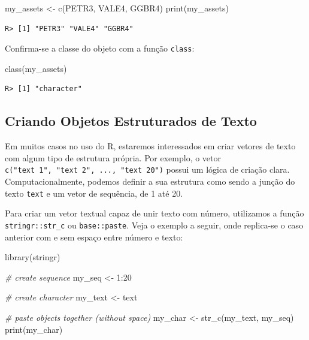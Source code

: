 \documentclass[
  11pt,
]{book}
\newenvironment{Shaded}{\begin{snugshade}}{\end{snugshade}}
\newcommand{\CommentTok}[1]{\textcolor[rgb]{0.37,0.37,0.37}{\textit{#1}}}
\newcommand{\DecValTok}[1]{\textcolor[rgb]{0.06,0.06,0.06}{#1}}
\newcommand{\FunctionTok}[1]{\textcolor[rgb]{0,0,0}{#1}}
\newcommand{\NormalTok}[1]{#1}
\newcommand{\OtherTok}[1]{\textcolor[rgb]{0.37,0.37,0.37}{#1}}
\newcommand{\SpecialCharTok}[1]{\textcolor[rgb]{0,0,0}{#1}}
\newcommand{\StringTok}[1]{\textcolor[rgb]{0.5,0.5,0.5}{#1}}
\begin{document}
\begin{Shaded}
\begin{Highlighting}[]
\NormalTok{my\_assets }\OtherTok{\textless{}{-}} \FunctionTok{c}\NormalTok{(}\StringTok{\textquotesingle{}PETR3\textquotesingle{}}\NormalTok{, }\StringTok{\textquotesingle{}VALE4\textquotesingle{}}\NormalTok{, }\StringTok{\textquotesingle{}GGBR4\textquotesingle{}}\NormalTok{)}
\FunctionTok{print}\NormalTok{(my\_assets)}
\end{Highlighting}
\end{Shaded}

\begin{verbatim}
R> [1] "PETR3" "VALE4" "GGBR4"
\end{verbatim}

Confirma-se a classe do objeto com a função \texttt{class}:

\begin{Shaded}
\begin{Highlighting}[]
\FunctionTok{class}\NormalTok{(my\_assets)}
\end{Highlighting}
\end{Shaded}

\begin{verbatim}
R> [1] "character"
\end{verbatim}

\hypertarget{criando-objetos-estruturados-de-texto}{%
\subsection{Criando Objetos Estruturados de Texto}\label{criando-objetos-estruturados-de-texto}}

Em muitos casos no uso do R, estaremos interessados em criar vetores de texto com algum tipo de estrutura própria. Por exemplo, o vetor \texttt{c("text\ 1",\ "text\ 2",\ ...,\ "text\ 20")} possui um lógica de criação clara. Computacionalmente, podemos definir a sua estrutura como sendo a junção do texto \texttt{text} e um vetor de sequência, de 1 até 20.

Para criar um vetor textual capaz de unir texto com número, utilizamos a função \texttt{stringr::str\_c} ou \texttt{base::paste}. Veja o exemplo a seguir, onde replica-se o caso anterior com e sem espaço entre número e texto: 

\begin{Shaded}
\begin{Highlighting}[]
\FunctionTok{library}\NormalTok{(stringr)}

\CommentTok{\# create sequence}
\NormalTok{my\_seq }\OtherTok{\textless{}{-}} \DecValTok{1}\SpecialCharTok{:}\DecValTok{20}

\CommentTok{\# create character}
\NormalTok{my\_text }\OtherTok{\textless{}{-}} \StringTok{\textquotesingle{}text\textquotesingle{}}

\CommentTok{\# paste objects together (without space)}
\NormalTok{my\_char }\OtherTok{\textless{}{-}} \FunctionTok{str\_c}\NormalTok{(my\_text, my\_seq)}
\FunctionTok{print}\NormalTok{(my\_char)}
\end{Highlighting}
\end{Shaded}
\end{document}
